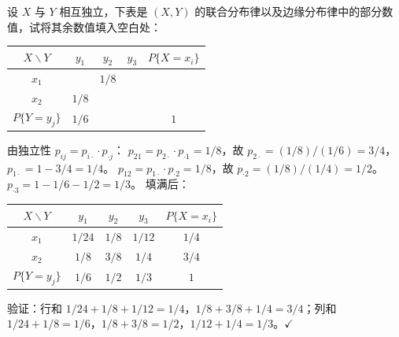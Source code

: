\documentclass[lang=cn,11pt]{elegantbook}
\begin{document}
\begin{exercise}[独立性填表] \label{exer:3-c7}
设 $X$ 与 $Y$ 相互独立，下表是 $(X,Y)$ 的联合分布律以及边缘分布律中的部分数值，试将其余数值填入空白处：
\begin{center}
\begin{tabular}{c|ccc|c}
\toprule
$X \backslash Y$ & $y_1$ & $y_2$ & $y_3$ & $P\{X=x_i\}$ \\
\midrule
$x_1$ & & $1/8$ & & \\
$x_2$ & $1/8$ & & & \\
\midrule
$P\{Y=y_j\}$ & $1/6$ & & & $1$ \\
\bottomrule
\end{tabular}
\end{center}
\end{exercise}
\begin{solution}
由独立性 $p_{ij} = p_{i\cdot}\cdot p_{\cdot j}$：
$p_{21} = p_{2\cdot}\cdot p_{\cdot 1} = 1/8$，故 $p_{2\cdot} = (1/8)/(1/6) = 3/4$，$p_{1\cdot} = 1 - 3/4 = 1/4$。
$p_{12} = p_{1\cdot}\cdot p_{\cdot 2} = 1/8$，故 $p_{\cdot 2} = (1/8)/(1/4) = 1/2$。
$p_{\cdot 3} = 1 - 1/6 - 1/2 = 1/3$。
填满后：
\begin{center}
\begin{tabular}{c|ccc|c}
\toprule
$X \backslash Y$ & $y_1$ & $y_2$ & $y_3$ & $P\{X=x_i\}$ \\
\midrule
$x_1$ & $1/24$ & $1/8$ & $1/12$ & $1/4$ \\[4pt]
$x_2$ & $1/8$ & $3/8$ & $1/4$ & $3/4$ \\
\midrule
$P\{Y=y_j\}$ & $1/6$ & $1/2$ & $1/3$ & $1$ \\
\bottomrule
\end{tabular}
\end{center}
验证：行和 $1/24+1/8+1/12=1/4$，$1/8+3/8+1/4=3/4$；列和 $1/24+1/8=1/6$，$1/8+3/8=1/2$，$1/12+1/4=1/3$。$\checkmark$
\end{solution}
\end{document}
